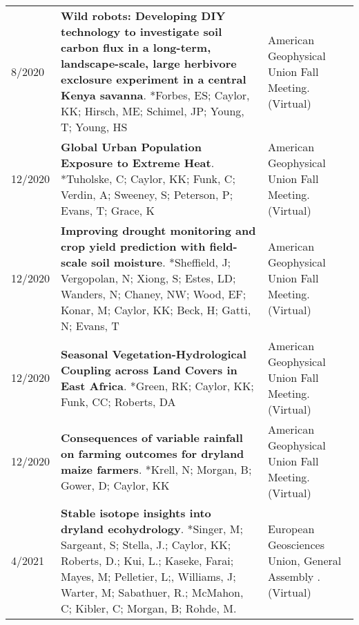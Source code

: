 \begin{longtable}{lp{9.0cm}p{4.5cm}}
8/2020 & {\bf Wild robots: Developing DIY technology to investigate soil carbon flux in a long-term, landscape-scale, large herbivore exclosure experiment in a central Kenya savanna}. *Forbes, ES; Caylor, KK; Hirsch, ME; Schimel, JP; Young, T; Young, HS  & American Geophysical Union Fall Meeting. (Virtual) \\
  
12/2020 & {\bf Global Urban Population Exposure to Extreme Heat}. *Tuholske, C; Caylor, KK; Funk, C; Verdin, A; Sweeney, S; Peterson, P; Evans, T; Grace, K  & American Geophysical Union Fall Meeting. (Virtual) \\
  
12/2020 & {\bf Improving drought monitoring and crop yield prediction with field-scale soil moisture}. *Sheffield, J; Vergopolan, N; Xiong, S; Estes, LD; Wanders, N; Chaney, NW; Wood, EF; Konar, M; Caylor, KK; Beck, H; Gatti, N; Evans, T  & American Geophysical Union Fall Meeting. (Virtual) \\
  
12/2020 & {\bf Seasonal Vegetation-Hydrological Coupling across Land Covers in East Africa}. *Green, RK; Caylor, KK; Funk, CC; Roberts, DA  & American Geophysical Union Fall Meeting. (Virtual) \\
  
12/2020 & {\bf Consequences of variable rainfall on farming outcomes for dryland maize farmers}. *Krell, N; Morgan, B; Gower, D; Caylor, KK  & American Geophysical Union Fall Meeting. (Virtual) \\
  
4/2021 & {\bf Stable isotope insights into dryland ecohydrology}. *Singer, M; Sargeant, S; Stella, J.; Caylor, KK; Roberts, D.; Kui, L.; Kaseke, Farai; Mayes, M; Pelletier, L;, Williams, J; Warter, M; Sabathuer, R.; McMahon, C; Kibler, C; Morgan, B; Rohde, M.   & European Geosciences Union, General Assembly 
. (Virtual) \\
 \end{longtable}


